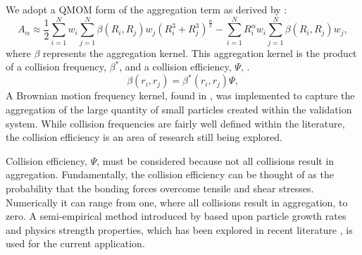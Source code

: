\documentclass[preprint,3p,a4paper,times,12pt,authoryear]{elsarticle}
\begin{document}
We adopt a QMOM form of the aggregation term as derived by \citet{Marchisio2003}:
\begin{equation}\label{aggreagtioneq}
A_{\alpha}  \approx \frac{1}{2} \sum_{i=1}^N w_i \sum_{j=1}^N \beta(R_i,R_j)  w_j (R_i^3 + R_j^3)^{\frac{\alpha}{3}} - \sum_{i=1}^N R_i^{\alpha} w_i \sum_{j=1}^N \beta(R_i,R_j) w_j ,
\end{equation}
where $\beta$ represents the aggregation kernel. This aggregation kernel is the product of a collision frequency, $\beta^*$, and a collision efficiency, $\Psi$, \cite{Liew2003}.
\begin{equation}
\beta (r_i , r_j ) = \beta^*  (r_i , r_j) \Psi ,
\end{equation}
A Brownian motion frequency kernel, found in \citep{Elimelech1995}, was implemented to capture the aggregation of the large quantity of small particles created within the validation system.
While collision frequencies are fairly well defined within the literature, the collision efficiency is an area of research still being explored.

Collision efficiency, $\Psi$, must be considered because not all collisions result in aggregation. Fundamentally, the collision efficiency can be thought of as the probability that the bonding forces overcome tensile and shear stresses.  Numerically it can range from one, where all collisions result in aggregation, to zero. 
 A semi-empirical method introduced by \citet{Hounslow2001,Liew2003,Andreassen2004} based upon particle growth rates and physics strength properties, which has been explored in recent literature \citep{David2003,Ilievski2006}, is used for the current application.
\end{document}
